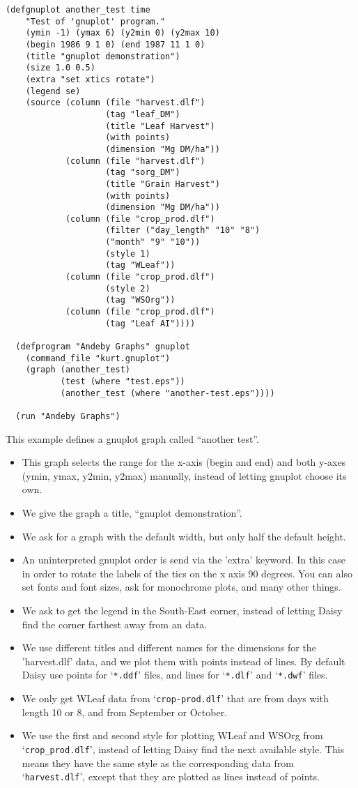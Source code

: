 \documentclass[a4paper]{article}
\begin{document}
\begin{verbatim}
(defgnuplot another_test time
    "Test of 'gnuplot' program."
    (ymin -1) (ymax 6) (y2min 0) (y2max 10)
    (begin 1986 9 1 0) (end 1987 11 1 0)
    (title "gnuplot demonstration")
    (size 1.0 0.5)
    (extra "set xtics rotate")
    (legend se)   
    (source (column (file "harvest.dlf")
                    (tag "leaf_DM")
                    (title "Leaf Harvest")
                    (with points)
                    (dimension "Mg DM/ha"))
            (column (file "harvest.dlf")
                    (tag "sorg_DM")
                    (title "Grain Harvest")
                    (with points)
                    (dimension "Mg DM/ha"))
            (column (file "crop_prod.dlf")
                    (filter ("day_length" "10" "8")
                    ("month" "9" "10"))
                    (style 1)
                    (tag "WLeaf"))
            (column (file "crop_prod.dlf")
                    (style 2)
                    (tag "WSOrg"))
            (column (file "crop_prod.dlf")
                    (tag "Leaf AI"))))
            
  (defprogram "Andeby Graphs" gnuplot
    (command_file "kurt.gnuplot")
    (graph (another_test)
           (test (where "test.eps"))
           (another_test (where "another-test.eps"))))
  
  (run "Andeby Graphs")
\end{verbatim}  
This example defines a gnuplot graph called ``another test''.
\begin{itemize}
\item This graph selects the range for the x-axis (begin and end)
  and both y-axes (ymin, ymax, y2min, y2max) manually, instead of
  letting gnuplot choose its own.
\item We give the graph a title, ``gnuplot demonstration''.
\item We ask for a graph with the default width, but only half the
  default height.
\item An uninterpreted gnuplot order is send via the 'extra' keyword.
  In this case in order to rotate the labels of the tics on the x axis
  90 degrees.  You can also set fonts and font sizes, ask for
  monochrome plots, and many other things.
\item We ask to get the legend in the South-East corner, instead of
  letting Daisy find the corner farthest away from an data.  
\item We use different titles and different names for the dimensions
  for the 'harvest.dlf' data, and we plot them with points instead of
  lines.  By default Daisy use points for `\texttt{*.ddf}' files, and
  lines for `\texttt{*.dlf}' and `\texttt{*.dwf}' files.
\item We only get WLeaf data from `\texttt{crop-prod.dlf}' that are
  from days with length 10 or 8, and from September or October.
\item We use the first and second style for plotting WLeaf and WSOrg
  from `\texttt{crop\_prod.dlf}', instead of letting Daisy find the
  next available style.  This means they have the same style as the
  corresponding data from `\texttt{harvest.dlf}', except that they are
  plotted as lines instead of points.
\end{itemize}
\end{document}
